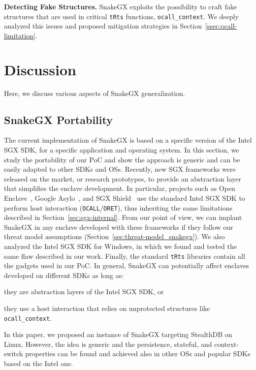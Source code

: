 \textbf{Detecting Fake Structures.}
SnakeGX exploits the possibility to craft fake structures
that are used in critical \texttt{tRts} functions, \ie \texttt{ocall\_context}.
We deeply analyzed this issues and proposed mitigation strategies in 
Section~\ref{ssec:ocall-limitation}.

\section{Discussion}
\label{sec:discussion_snakegx}

Here, we discuss various aspects of SnakeGX generalization.

\subsection{SnakeGX Portability}
The current implementation of SnakeGX is based on a specific version 
of the Intel SGX SDK, for a specific application and operating system.
In this section, we study the portability of our PoC and show the approach 
is generic and can be easily adapted to other SDKs and OSs.
Recently, new SGX frameworks were released on the market, or research 
prototypes, to provide an abstraction layer that simplifies the enclave 
development.
In particular, projects such as Open Enclave~\cite{openenclave}, Google 
Asylo~\cite{gasylo}, and SGX Shield~\cite{baumann2015shielding} 
use the standard Intel SGX SDK to perform host 
interaction (\ie \texttt{OCALL}/\texttt{ORET}), thus inheriting the same 
limitations described in Section~\ref{sec:sgx-internal}.
From our point of view, we can implant SnakeGX in any enclave developed with 
these frameworks if they follow our threat model assumptions 
(Section~\ref{sec:threat-model_snakegx}).
We also analyzed the Intel SGX SDK for Windows, in which we found and tested 
the same flaw described in our work.
Finally, the standard \texttt{tRts} libraries contain all the gadgets used in 
our PoC.
In general, SnakeGX can potentially affect enclaves developed on different
SDKs as long as: 
\begin{enumerate*}[label=(\roman*)]
	\item they are abstraction layers of the Intel SGX SDK, or
	\item they use a host interaction that relies on unprotected structures 
	like \texttt{ocall\_context}.
\end{enumerate*}
In this paper, we proposed an instance of SnakeGX targeting StealthDB on Linux. 
However, the idea is generic and the persistence, stateful, and context-switch 
properties can be found and achieved also in other OSs and popular SDKs based 
on the Intel one.

